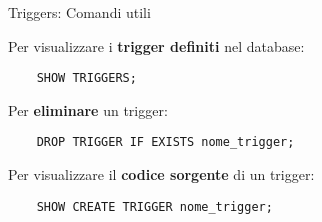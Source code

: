 %
\begin{frame}[fragile]{Triggers: Comandi utili}

Per visualizzare i \textbf{trigger definiti} nel database:
\begin{lstlisting}
    SHOW TRIGGERS;
\end{lstlisting}

Per \textbf{eliminare} un trigger:
\begin{lstlisting}
    DROP TRIGGER IF EXISTS nome_trigger;
\end{lstlisting}

Per visualizzare il \textbf{codice sorgente} di un trigger:
\begin{lstlisting}
    SHOW CREATE TRIGGER nome_trigger;
\end{lstlisting}

\end{frame}
%
